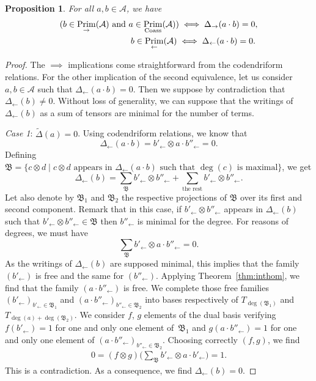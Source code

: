 \documentclass[10pt,a4paper]{amsart}
\numberwithin{equation}{section}
\theoremstyle{definition}
\theoremstyle{plain}
\newtheorem{Prop}[defi]{Proposition}
\DeclareMathOperator{\Prim}{Prim}
\begin{document}
\begin{Prop}
	For all $a,b\in \mathcal{A}$, we have
	\begin{gather*}
	(b\in\Prim_{\rightarrow}(\mathcal{A}) \  \text{\normalfont and} \  a\in\Prim_{\rm Coass}(\mathcal{A})) \iff \Delta_{\rightarrow}(a\cdot b)=0, \\
	\hphantom{(b\in\Prim_{\rightarrow}(\mathcal{A})\  \text{\normalfont and} \ }{} b\in\Prim_{\leftarrow}(\mathcal{A}) \iff \Delta_{\leftarrow}(a\cdot b)=0.
	\end{gather*}
\end{Prop}
\begin{proof}
	The $\implies$ implications come straightforward from the codendriform relations.
	For the other implication of the second equivalence, let us consider $a,b\in \mathcal{A}$ such that $\Delta_{\leftarrow}(a\cdot b)=0$.
	Then we suppose by contradiction that $\Delta_{\leftarrow}(b)\neq 0$. Without loss of generality, we can suppose that the writings of $\Delta_{\leftarrow}(b)$ as a sum of tensors are minimal for the number of terms.
	
	\textit{Case 1}: $\tilde{\Delta}(a)=0$.
	Using codendriform relations, we know that
	\[
	\Delta_{\leftarrow}(a\cdot b)=b'_{\leftarrow}\otimes a\cdot b''_{\leftarrow}=0.
	\]
	Defining $\mathfrak{B}=\{ c\otimes d \mid c\otimes d \text{ appears in } \Delta_{\leftarrow}(a\cdot b) \text{ such that } \deg(c) \text{ is maximal}\}$, we get
	\[
	\Delta_{\leftarrow}(b)=\sum_{\mathfrak{B}} b'_{\leftarrow}\otimes b''_{\leftarrow}+\sum_{\text{the rest}} b'_{\leftarrow}\otimes b''_{\leftarrow}.
	\]
	Let also denote by $\mathfrak{B}_1$ and $\mathfrak{B}_2$ the respective projections of $\mathfrak{B}$ over its first and second component. Remark that in this case, if $b'_{\leftarrow}\otimes b''_{\leftarrow}$ appears in $\Delta_{\leftarrow}(b)$ such that $b'_{\leftarrow}\otimes b''_{\leftarrow}\in\mathfrak{B}$ then $b''_{\leftarrow}$ is minimal for the degree. For reasons of degrees, we must have
	\[
	\sum_{\mathfrak{B}} b'_{\leftarrow}\otimes a\cdot b''_{\leftarrow}=0.
	\]
	As the writings of $\Delta_{\leftarrow}(b)$ are supposed minimal, this implies that the family $(b'_{\leftarrow})$ is free and the same for $(b''_{\leftarrow})$.
Applying Theorem~\ref{thm:inthom}, we find that the family $(a\cdot b''_{\leftarrow})$ is free.
We complete those free families $(b'_{\leftarrow})_{b'_{\leftarrow}\in\mathfrak{B}_1}$ and $(a\cdot b''_{\leftarrow})_{ b''_{\leftarrow}\in\mathfrak{B}_2}$ into bases respectively of $T_{\deg(\mathfrak{B}_1)}$ and $T_{\deg(a)+\deg(\mathfrak{B}_2)}$. We consider $f$, $g$ elements of the dual basis verifying $f(b'_{\leftarrow})=1$ for one and only one element of~$\mathfrak{B}_1$ and $g(a\cdot b''_{\leftarrow})=1$ for one and only one element of $(a\cdot b''_{\leftarrow})_{b''_{\leftarrow}\in\mathfrak{B}_2}$. Choosing correctly $(f,g)$, we find
	\begin{align*}
		0=(f\otimes g)\bigg( \sum_{\mathfrak{B}} b'_{\leftarrow}\otimes a\cdot b'_{\leftarrow} \bigg)=1.
	\end{align*}
	This is a contradiction. As a consequence, we find $\Delta_{\leftarrow}(b)=0$.
	

\end{proof}
\end{document}
